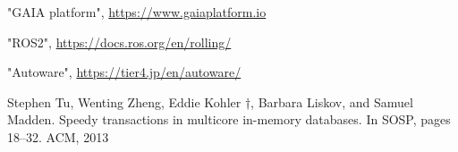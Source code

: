 \documentclass{jarticle}
\begin{document}
\begin{multicols}{2}
\begin{thebibliography}{99}
 "GAIA platform", \url{https://www.gaiaplatform.io}

 "ROS2", \url{https://docs.ros.org/en/rolling/}

 "Autoware", \url{https://tier4.jp/en/autoware/}

 Stephen Tu, Wenting Zheng, Eddie Kohler †, Barbara Liskov,
and Samuel Madden. Speedy transactions in multicore in-memory
databases. In SOSP, pages 18–32. ACM, 2013

\end{thebibliography}
	
\end{multicols}	
\end{document}
